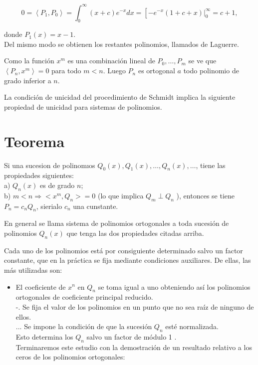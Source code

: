 \documentclass[10pt]{article}
\theoremstyle{plain}
\theoremstyle{definition}
\theoremstyle{remark}
\begin{document}
$$
0=\left\langle P_{1}, P_{0}\right\rangle=\int_{0}^{\infty}(x+c) e^{-x} d x=\left[-\left.e^{-x}(1+c+x)\right|_{0} ^{\infty}=c+1,\right.
$$

donde $P_{1}(x)=x-1$.\\
Del mismo modo se obtienen los restantes polinomios, llamados de Laguerre.

Como la función $x^{m}$ es una combinación lineal de $P_{0}, \ldots, P_{m}$ se ve que $\left\langle P_{n}, x^{m}\right\rangle=0$ para todo $m<n$. Luego $P_{n}$ es ortogonal $a$ todo polinomio de grado inferior a $n$.

La condición de unicidad del procedimiento de Schmidt implica la siguiente propiedad de unicidad para sistemas de polinomios.

\section*{Teorema}
Si una sucesion de polinomıos $Q_{0}(x), Q_{1}(x), \ldots, Q_{n}(x), \ldots$, tiene las propiedades siguientes:\\
a) $Q_{n}(x)$ es de grado $n$;\\
b) $m<n \Rightarrow<x^{m}, Q_{n}>=0$ (lo que implica $Q_{m} \perp Q_{n}$ ), entonces se tiene $P_{n}=c_{n} Q_{n}$, sierialo $c_{n}$ una cunstante.

En general se llama sistema de polinomios ortogonales a toda sucesión de polinomios $Q_{n}(x)$ que tenga las dos propiedades citadas arriba.

Cada uno de los polinomios está por consiguiente determinado salvo un factor constante, que en la práctica se fija mediante condiciones auxiliares. De ellas, las más utilizadas son:

\begin{itemize}
  \item El coeficiente de $x^{n}$ en $Q_{n}$ se toma igual a uno obteniendo así los polinomios ortogonales de coeficiente principal reducido.\\
-. Se fija el valor de los polinomios en un punto que no sea raíz de ninguno de ellos.\\
... Se impone la condición de que la sucesión $Q_{n}$ esté normalizada.\\
Esto determina los $Q_{n}$ salvo un factor de módulo 1 .\\
Terminaremos este estudio con la demostración de un resultado relativo a los ceros de los polinomios ortogonales:
\end{itemize}
\end{document}
